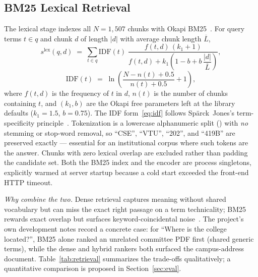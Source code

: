 \subsection{BM25 Lexical Retrieval}
The lexical stage indexes all $N = 1{,}507$ chunks with Okapi
BM25~\cite{robertson1994okapi,robertson2009bm25}. For query terms
$t \in q$ and chunk $d$ of length $|d|$ with average chunk length
$\overline{L}$,
\begin{equation}
s^{\mathrm{lex}}(q,d) \;=\; \sum_{t \in q}
\mathrm{IDF}(t)\;
\frac{f(t,d)\,(k_1 + 1)}
{f(t,d) + k_1\!\left(1 - b + b\,\dfrac{|d|}{\overline{L}}\right)},
\label{eq:bm25}
\end{equation}
\begin{equation}
\mathrm{IDF}(t) \;=\; \ln\!\left(
\frac{N - n(t) + 0.5}{n(t) + 0.5} + 1 \right),
\label{eq:idf}
\end{equation}
where $f(t,d)$ is the frequency of $t$ in $d$, $n(t)$ is the number of
chunks containing $t$, and $(k_1, b)$ are the Okapi free parameters left at
the  library defaults ($k_1 = 1.5$, $b = 0.75$). The
IDF form~\eqref{eq:idf} follows Sp\"arck~Jones's term-specificity
principle~\cite{sparckjones1972idf}. Tokenization is a lowercase
alphanumeric split (\code{[a-z0-9]+}) with \emph{no} stemming or stop-word
removal, so ``CSE'', ``VTU'', ``202'', and ``419B'' are preserved exactly
--- essential for an institutional corpus where such tokens are the answer.
Chunks with zero lexical overlap are excluded rather than padding the
candidate set. Both the BM25 index and the encoder are process singletons,
explicitly warmed at server startup because a cold start exceeded the
front-end HTTP timeout.

\emph{Why combine the two.} Dense retrieval captures meaning without shared
vocabulary but can miss the exact right passage on a term technicality;
BM25 rewards exact overlap but surfaces keyword-coincidental
noise~\cite{wang2021interpolation}. The project's own development notes
record a concrete case: for ``Where is the college located?'', BM25 alone
ranked an unrelated committee PDF first (shared generic terms), while the
dense and hybrid rankers both surfaced the campus-address document.
Table~\ref{tab:retrieval} summarizes the trade-offs qualitatively; a
quantitative comparison is proposed in Section~\ref{sec:eval}.

